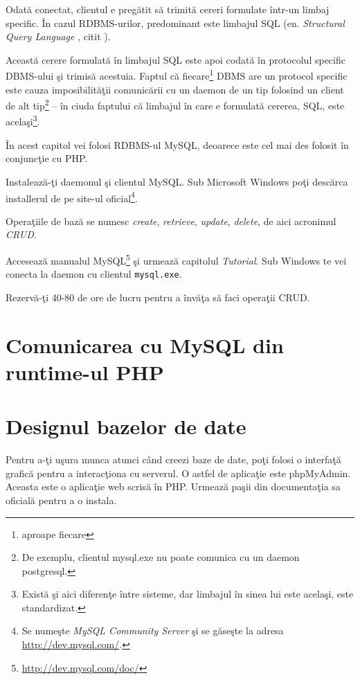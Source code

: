 Odată conectat, clientul e pregătit să trimită cereri formulate
într-un limbaj specific. În cazul RDBMS-urilor, predominant este
limbajul SQL (en. \textsl{Structural Query Language}
, citit \texttt{}).%

Această cerere formulată în limbajul SQL este apoi codată în
protocolul specific DBMS-ului şi trimisă acestuia.
Faptul că fiecare\footnote{aproape fiecare} DBMS are un protocol
specific este cauza imposibilităţii comunicării cu un daemon
de un tip folosind un client de alt tip\footnote{De exemplu,
clientul mysql.exe nu poate comunica cu un daemon postgresql.}
-- în ciuda faptului că limbajul în care e formulată cererea, SQL,
este acelaşi\footnote{Există şi aici diferenţe între sisteme,
dar limbajul în sinea lui este acelaşi, este standardizat.}.

În acest capitol vei folosi RDBMS-ul MySQL, deoarece este
cel mai des folosit în conjuncţie cu PHP.

\begin{Exercise}[title={Primii paşi în baze de date}]
\ExePart

Instalează-ţi daemonul şi clientul MySQL. Sub Microsoft
Windows poţi descărca installerul de pe site-ul
oficial\footnote{Se numeşte \textit{MySQL Community Server} şi se găseşte
la adresa \url{http://dev.mysql.com/}.}.

\ExePart

Operaţiile de bază se numesc \textit{create}, \textit{retrieve},
\textit{update}, \textit{delete}, de aici acronimul \textsl{CRUD}.

Accesează manualul MySQL\footnote{\url{http://dev.mysql.com/doc/}}
şi urmează capitolul \textit{Tutorial}. Sub Windows te vei conecta la daemon
cu clientul \texttt{mysql.exe}.

Rezervă-ţi 40-80 de ore de lucru pentru a învăţa să faci operaţii CRUD.
\end{Exercise}

\section{Comunicarea cu MySQL din runtime-ul PHP}

\section{Designul bazelor de date}
Pentru a-ţi uşura munca atunci când creezi baze de date, poţi folosi o interfaţă grafică
pentru a interacţiona cu serverul. O astfel de aplicaţie este phpMyAdmin.
Aceasta este o aplicaţie web scrisă în PHP.
Urmează paşii
din documentaţia sa oficială pentru a o instala.

